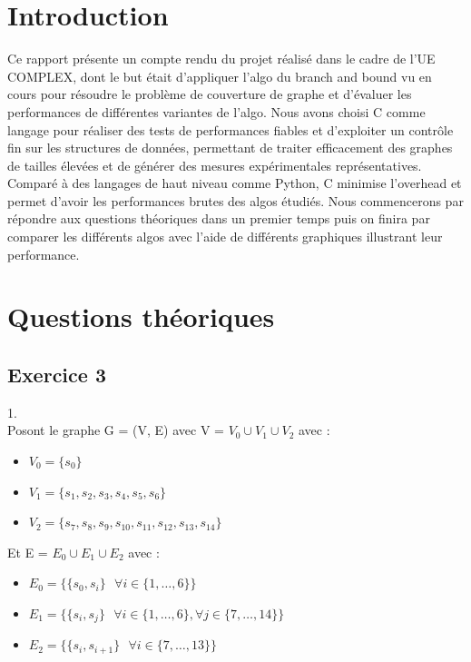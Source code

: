 \documentclass{article}
\begin{document}
\tableofcontents

\vspace{1cm} %
\hspace{2cm}

\section{Introduction}
Ce rapport présente un compte rendu du projet réalisé dans le cadre de l’UE COMPLEX, 
dont le but était d'appliquer l'algo du branch and bound vu en cours pour résoudre 
le problème de couverture de graphe et d'évaluer les performances de différentes variantes de l'algo. 
Nous avons choisi C comme langage pour réaliser des tests de performances fiables et d'exploiter
un contrôle fin sur les structures de données, permettant de traiter efficacement des graphes
de tailles élevées et de générer des mesures expérimentales représentatives.
Comparé à des langages de haut niveau comme Python, C minimise l'overhead et permet d'avoir 
les performances brutes des algos étudiés.
Nous commencerons par répondre aux questions théoriques dans un premier temps puis on finira par 
comparer les différents algos avec l'aide de différents graphiques illustrant leur performance.

\section{Questions théoriques}

\subsection{Exercice 3}

1. \\
Posont le graphe G = (V, E) avec V = $V_0 \cup V_1 \cup V_2$ avec :
\begin{itemize}
    \item $V_0 = \{s_0\}$
    \item $V_1 = \{s_1, s_2, s_3, s_4, s_5, s_6\}$
    \item $V_2 = \{s_7, s_8, s_9, s_{10}, s_{11}, s_{12}, s_{13}, s_{14}\}$
\end{itemize}
Et E = $E_0 \cup E_1 \cup E_2$ avec : 
\begin{itemize}
    \item $E_0 = \{\{s_0, s_i\} \text{  } \forall i \in \{1, \dots, 6\} \}$
    \item $E_1 = \{\{s_i, s_j\} \text{  } \forall i \in \{1, \dots, 6\}, \forall j \in \{7, \dots, 14\}\}$
    \item $E_2 = \{\{s_i, s_{i+1}\} \text{  } \forall i \in \{7, \dots, 13\}\}$
\end{itemize} 
\end{document}
